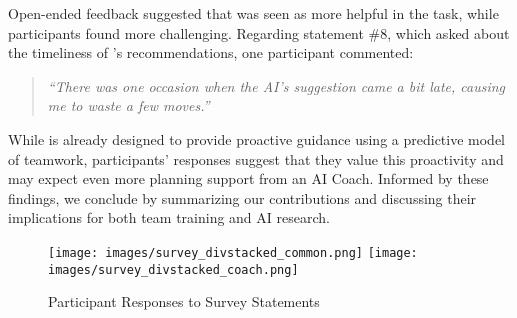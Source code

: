 Open-ended feedback suggested that \coach was seen as more helpful in the \movers task, while participants found \rescue more challenging. 
Regarding statement \#8, which asked about the timeliness of \coach’s recommendations, one participant commented:
\begin{quote}
\textit{“There was one occasion when the AI’s suggestion came a bit late, causing me to waste a few moves.”}
\end{quote}
While \coach is already designed to provide proactive guidance using a predictive model of teamwork, participants' responses suggest that they value this proactivity and may expect even more planning support from an AI Coach.  Informed by these findings, we conclude by summarizing our contributions and discussing their implications for both team training and AI research.
\begin{figure}
  \centering
  \texttt{[image: images/survey\_divstacked\_common.png]}
  \newline
  \texttt{[image: images/survey\_divstacked\_coach.png]} \vspace{-1em}
  \caption{Participant Responses to Survey Statements}
  \label{fig: survey plot} 
\end{figure}
